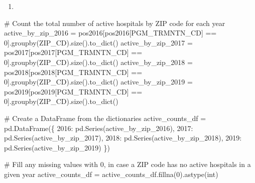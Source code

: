 \documentclass[
  letterpaper,
  DIV=11,
  numbers=noendperiod]{scrartcl}
\newenvironment{Shaded}{\begin{snugshade}}{\end{snugshade}}
\newcommand{\BuiltInTok}[1]{\textcolor[rgb]{0.00,0.23,0.31}{#1}}
\newcommand{\CommentTok}[1]{\textcolor[rgb]{0.37,0.37,0.37}{#1}}
\newcommand{\DecValTok}[1]{\textcolor[rgb]{0.68,0.00,0.00}{#1}}
\newcommand{\NormalTok}[1]{\textcolor[rgb]{0.00,0.23,0.31}{#1}}
\newcommand{\OperatorTok}[1]{\textcolor[rgb]{0.37,0.37,0.37}{#1}}
\newcommand{\StringTok}[1]{\textcolor[rgb]{0.13,0.47,0.30}{#1}}
\providecommand{\tightlist}{%
  \setlength{\itemsep}{0pt}\setlength{\parskip}{0pt}}\usepackage{longtable,booktabs,array}
\begin{document}
\begin{enumerate}
\def\labelenumi{\arabic{enumi}.}
\setcounter{enumi}{2}
\tightlist
\item
\end{enumerate}

\begin{Shaded}
\begin{Highlighting}[]
\CommentTok{\# Count the total number of active hospitals by ZIP code for each year}
\NormalTok{active\_by\_zip\_2016 }\OperatorTok{=}\NormalTok{ pos2016[pos2016[}\StringTok{\textquotesingle{}PGM\_TRMNTN\_CD\textquotesingle{}}\NormalTok{] }\OperatorTok{==} \DecValTok{0}\NormalTok{].groupby(}\StringTok{\textquotesingle{}ZIP\_CD\textquotesingle{}}\NormalTok{).size().to\_dict()}
\NormalTok{active\_by\_zip\_2017 }\OperatorTok{=}\NormalTok{ pos2017[pos2017[}\StringTok{\textquotesingle{}PGM\_TRMNTN\_CD\textquotesingle{}}\NormalTok{] }\OperatorTok{==} \DecValTok{0}\NormalTok{].groupby(}\StringTok{\textquotesingle{}ZIP\_CD\textquotesingle{}}\NormalTok{).size().to\_dict()}
\NormalTok{active\_by\_zip\_2018 }\OperatorTok{=}\NormalTok{ pos2018[pos2018[}\StringTok{\textquotesingle{}PGM\_TRMNTN\_CD\textquotesingle{}}\NormalTok{] }\OperatorTok{==} \DecValTok{0}\NormalTok{].groupby(}\StringTok{\textquotesingle{}ZIP\_CD\textquotesingle{}}\NormalTok{).size().to\_dict()}
\NormalTok{active\_by\_zip\_2019 }\OperatorTok{=}\NormalTok{ pos2019[pos2019[}\StringTok{\textquotesingle{}PGM\_TRMNTN\_CD\textquotesingle{}}\NormalTok{] }\OperatorTok{==} \DecValTok{0}\NormalTok{].groupby(}\StringTok{\textquotesingle{}ZIP\_CD\textquotesingle{}}\NormalTok{).size().to\_dict()}

\CommentTok{\# Create a DataFrame from the dictionaries}
\NormalTok{active\_counts\_df }\OperatorTok{=}\NormalTok{ pd.DataFrame(\{}
    \StringTok{\textquotesingle{}2016\textquotesingle{}}\NormalTok{: pd.Series(active\_by\_zip\_2016),}
    \StringTok{\textquotesingle{}2017\textquotesingle{}}\NormalTok{: pd.Series(active\_by\_zip\_2017),}
    \StringTok{\textquotesingle{}2018\textquotesingle{}}\NormalTok{: pd.Series(active\_by\_zip\_2018),}
    \StringTok{\textquotesingle{}2019\textquotesingle{}}\NormalTok{: pd.Series(active\_by\_zip\_2019)}
\NormalTok{\})}

\CommentTok{\# Fill any missing values with 0, in case a ZIP code has no active hospitals in a given year}
\NormalTok{active\_counts\_df }\OperatorTok{=}\NormalTok{ active\_counts\_df.fillna(}\DecValTok{0}\NormalTok{).astype(}\BuiltInTok{int}\NormalTok{)}


\end{Highlighting}
\end{Shaded}
\end{document}

